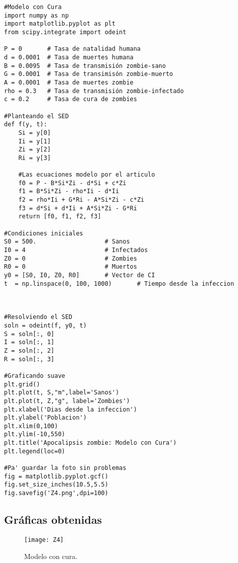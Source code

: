 \documentclass[12pt]{article}
\begin{document}
{\color{BlueViolet}\begin{verbatim}
#Modelo con Cura
import numpy as np
import matplotlib.pyplot as plt
from scipy.integrate import odeint

P = 0       # Tasa de natalidad humana
d = 0.0001  # Tasa de muertes humana
B = 0.0095  # Tasa de transmisión zombie-sano
G = 0.0001  # Tasa de transimisón zombie-muerto
A = 0.0001  # Tasa de muertes zombie
rho = 0.3   # Tasa de transmisión zombie-infectado
c = 0.2     # Tasa de cura de zombies

#Planteando el SED
def f(y, t):
    Si = y[0]
    Ii = y[1]
    Zi = y[2]
    Ri = y[3]
  
    #Las ecuaciones modelo por el articulo
    f0 = P - B*Si*Zi - d*Si + c*Zi
    f1 = B*Si*Zi - rho*Ii - d*Ii
    f2 = rho*Ii + G*Ri - A*Si*Zi - c*Zi
    f3 = d*Si + d*Ii + A*Si*Zi - G*Ri
    return [f0, f1, f2, f3]

#Condiciones iniciales
S0 = 500.                   # Sanos
I0 = 4                      # Infectados
Z0 = 0                      # Zombies
R0 = 0                      # Muertos
y0 = [S0, I0, Z0, R0]       # Vector de CI
t  = np.linspace(0, 100, 1000)       # Tiempo desde la infeccion



#Resolviendo el SED
soln = odeint(f, y0, t)
S = soln[:, 0]
I = soln[:, 1]
Z = soln[:, 2]
R = soln[:, 3]

#Graficando suave
plt.grid()
plt.plot(t, S,"m",label='Sanos')
plt.plot(t, Z,"g", label='Zombies')
plt.xlabel('Dias desde la infeccion')
plt.ylabel('Poblacion')
plt.xlim(0,100)
plt.ylim(-10,550)
plt.title('Apocalipsis zombie: Modelo con Cura')
plt.legend(loc=0)

#Pa' guardar la foto sin problemas
fig = matplotlib.pyplot.gcf()
fig.set_size_inches(10.5,5.5)
fig.savefig('Z4.png',dpi=100)
\end{verbatim}}

\subsection*{Gráficas obtenidas}

\begin{figure}[H]
\centering
 \texttt{[image: Z4]}
 \caption{Modelo con cura.}
\end{figure}


\pagebreak
\end{document}

